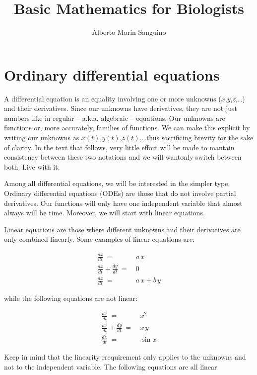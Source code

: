 \documentclass[12pt]{article}
\title{Basic Mathematics for Biologists}
\author{Alberto Marin Sanguino}
\begin{document}
\maketitle

\begin{abstract}

\end{abstract}

\section{Ordinary differential equations}

A differential equation is an equality involving one or more unknowns ($x$,$y$,$z$,\dots) and their derivatives. Since our unknowns have derivatives, they are not just numbers like in regular -- a.k.a. algebraic -- equations. Our unknowns are functions or, more accurately, families of functions. We can make this explicit by writing our unknowns as $x(t)$,$y(t)$,$z(t)$,\dots thus sacrificing brevity for the sake of clarity. In the text that follows, very little effort will be made to mantain consistency between these two notations and we will wantonly switch between both. Live with it.

Among all differential equations, we will be interested in the simpler type. Ordinary differential equations (ODEs) are those that do not involve partial derivatives. Our functions will only have one independent variable that almost always will be time. Moreover, we will start with linear equations.

Linear equations are those where different unknowns and their derivatives are only combined linearly. Some examples of linear equations are:

\begin{align}
	\frac{dx}{dt} \: = \: &  a \, x	\\
	\frac{dx}{dt} + \frac{dy}{dt}\: = \: &  0 \\
	\frac{dx}{dt} \: = \: &  a \, x + b \, y
\end{align}

while the following equations are not linear:

\begin{align}
	\frac{dx}{dt} \: = \: &  x^2	\\
	\frac{dx}{dt} + \frac{dy}{dt}\: = \: &  x \, y \\
	\frac{dx}{dt} \: = \: &  \sin x 
\end{align}

Keep in mind that the linearity rrequirement only applies to the unknowns and not to the independent variable. The following equations are all linear
\end{document}
